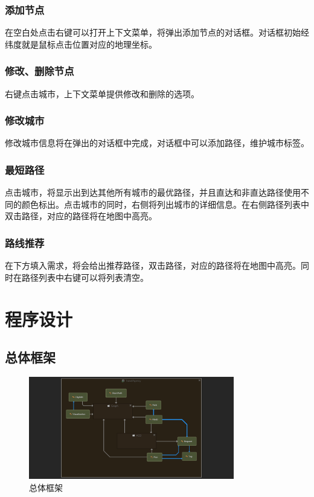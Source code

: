 \documentclass[12pt,a4paper]{article}
\begin{document}
\subsubsection{添加节点}
在空白处点击右键可以打开上下文菜单，将弹出添加节点的对话框。对话框初始经纬度就是鼠标点击位置对应的地理坐标。
\subsubsection{修改、删除节点}
右键点击城市，上下文菜单提供修改和删除的选项。
\subsubsection{修改城市}
修改城市信息将在弹出的对话框中完成，对话框中可以添加路径，维护城市标签。
\subsubsection{最短路径}
点击城市，将显示出到达其他所有城市的最优路径，并且直达和非直达路径使用不同的颜色标出。点击城市的同时，右侧将列出城市的详细信息。在右侧路径列表中双击路径，对应的路径将在地图中高亮。
\subsubsection{路线推荐}
在下方填入需求，将会给出推荐路径，双击路径，对应的路径将在地图中高亮。同时在路径列表中右键可以将列表清空。
\section{程序设计}
\subsection{总体框架}
\begin{figure}[H]
\centering
\includegraphics[width=0.8\textwidth]{8.png}
\caption{总体框架} 
\end{figure}
\end{document}
